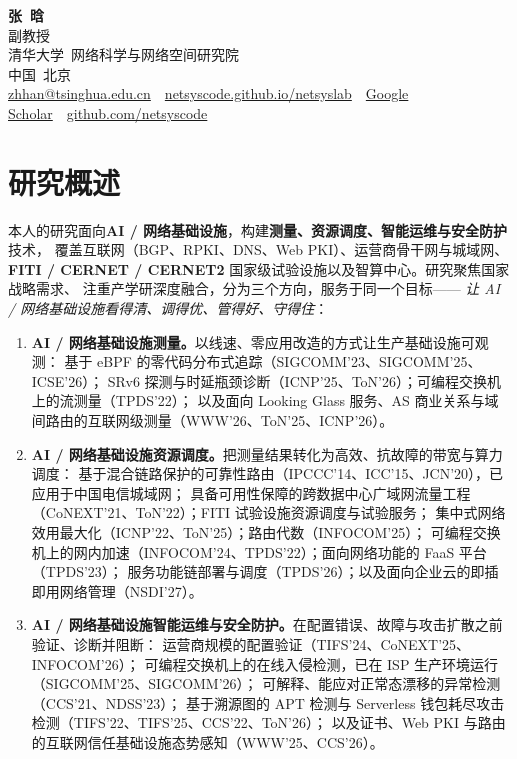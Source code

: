 \documentclass[11pt]{article}
\begin{document}
\begin{center}
  {\Huge\bfseries\color{accent} 张\ 晗}\\[5pt]
  {\large 副教授}\\[3pt]
  清华大学\ 网络科学与网络空间研究院\\
  中国\ 北京\\[5pt]
  \small
  \href{mailto:zhhan@tsinghua.edu.cn}{zhhan@tsinghua.edu.cn}\ \textbullet\
  \href{https://netsyscode.github.io/netsyslab/}{netsyscode.github.io/netsyslab}\ \textbullet\
  \href{https://scholar.google.com/citations?user=2_wPPU0AAAAJ}{Google Scholar}\ \textbullet\
  \href{https://github.com/netsyscode}{github.com/netsyscode}
\end{center}
\vspace{2pt}

\section*{研究概述}
\noindent
本人的研究面向\textbf{AI / 网络基础设施}，构建\textbf{测量、资源调度、智能运维与安全防护}技术，
覆盖互联网（BGP、RPKI、DNS、Web PKI）、运营商骨干网与城域网、
\textbf{FITI / CERNET / CERNET2} 国家级试验设施以及智算中心。研究聚焦国家战略需求、
注重产学研深度融合，分为三个方向，服务于同一个目标——
\emph{让 AI / 网络基础设施看得清、调得优、管得好、守得住}：

\begin{enumerate}[leftmargin=1.8em,label=\textbf{\arabic*.}]
  \item \textbf{AI / 网络基础设施测量。}以线速、零应用改造的方式让生产基础设施可观测：
  基于 eBPF 的零代码分布式追踪（SIGCOMM'23、SIGCOMM'25、ICSE'26）；
  SRv6 探测与时延瓶颈诊断（ICNP'25、ToN'26）；可编程交换机上的流测量（TPDS'22）；
  以及面向 Looking Glass 服务、AS 商业关系与域间路由的互联网级测量（WWW'26、ToN'25、ICNP'26）。
  \item \textbf{AI / 网络基础设施资源调度。}把测量结果转化为高效、抗故障的带宽与算力调度：
  基于混合链路保护的可靠性路由（IPCCC'14、ICC'15、JCN'20），已应用于中国电信城域网；
  具备可用性保障的跨数据中心广域网流量工程（CoNEXT'21、ToN'22）；FITI 试验设施资源调度与试验服务；
  集中式网络效用最大化（ICNP'22、ToN'25）；路由代数（INFOCOM'25）；
  可编程交换机上的网内加速（INFOCOM'24、TPDS'22）；面向网络功能的 FaaS 平台（TPDS'23）；
  服务功能链部署与调度（TPDS'26）；以及面向企业云的即插即用网络管理（NSDI'27）。
  \item \textbf{AI / 网络基础设施智能运维与安全防护。}在配置错误、故障与攻击扩散之前验证、诊断并阻断：
  运营商规模的配置验证（TIFS'24、CoNEXT'25、INFOCOM'26）；
  可编程交换机上的在线入侵检测，已在 ISP 生产环境运行（SIGCOMM'25、SIGCOMM'26）；
  可解释、能应对正常态漂移的异常检测（CCS'21、NDSS'23）；
  基于溯源图的 APT 检测与 Serverless 钱包耗尽攻击检测（TIFS'22、TIFS'25、CCS'22、ToN'26）；
  以及证书、Web PKI 与路由的互联网信任基础设施态势感知（WWW'25、CCS'26）。
\end{enumerate}
\end{document}
